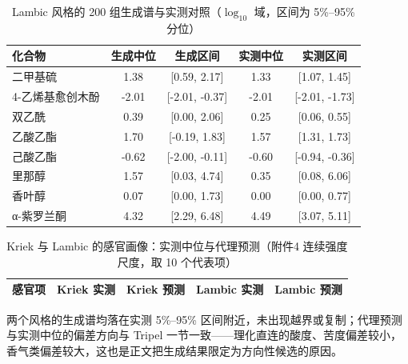 \begin{table}[H]
\centering
\footnotesize
\caption{Lambic 风格的 200 组生成谱与实测对照（$\log_{10}$ 域，区间为 5\%--95\% 分位）}
\label{tab:A2L}
\begin{tabular*}{\textwidth}{@{\extracolsep{\fill}}p{3.4cm}cccc@{}}
\toprule
\textbf{化合物} & \textbf{生成中位} & \textbf{生成区间} & \textbf{实测中位} & \textbf{实测区间} \\
\midrule
二甲基硫 & 1.38 & [0.59, 2.17] & 1.33 & [1.07, 1.45] \\
4-乙烯基愈创木酚 & -2.01 & [-2.01, -0.37] & -2.01 & [-2.01, -1.73] \\
双乙酰 & 0.39 & [0.00, 2.06] & 0.25 & [0.06, 0.55] \\
乙酸乙酯 & 1.70 & [-0.19, 1.83] & 1.57 & [1.31, 1.73] \\
己酸乙酯 & -0.62 & [-2.00, -0.11] & -0.60 & [-0.94, -0.36] \\
里那醇 & 1.57 & [0.03, 4.74] & 0.35 & [0.08, 6.06] \\
香叶醇 & 0.07 & [0.00, 1.73] & 0.00 & [0.00, 0.77] \\
α-紫罗兰酮 & 4.32 & [2.29, 6.48] & 4.49 & [3.07, 5.11] \\
\bottomrule
\end{tabular*}
\end{table}

\begin{table}[H]
\centering
\footnotesize
\caption{Kriek 与 Lambic 的感官画像：实测中位与代理预测（附件4 连续强度尺度，取 10 个代表项）}
\label{tab:A2b}
\begin{tabular*}{\textwidth}{@{\extracolsep{\fill}}lcccc@{}}
\toprule
\textbf{感官项} & \textbf{Kriek 实测} & \textbf{Kriek 预测} & \textbf{Lambic 实测} & \textbf{Lambic 预测} \\
\midrule
\bottomrule
\end{tabular*}
\end{table}

两个风格的生成谱均落在实测 5\%--95\% 区间附近，未出现越界或复制；代理预测与实测中位的偏差方向与 Tripel 一节一致——理化直连的酸度、苦度偏差较小，香气类偏差较大，这也是正文把生成结果限定为方向性候选的原因。